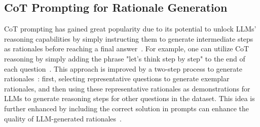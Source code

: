 \subsection{CoT Prompting for Rationale Generation}

CoT prompting has gained great popularity due to its potential to unlock LLMs' reasoning capabilities by simply instructing them to generate intermediate steps as rationales before reaching a final answer~\citep{wei_chain--thought_2023}. For example, one can utilize CoT reasoning by simply adding the phrase "let's think step by step" to the end of each question~\citep{kojima_large_2023}. This approach is improved by a two-step process to generate rationales~\citep{zhang_automatic_2022}: first, selecting representative questions to generate exemplar rationales, and then using these representative rationales as demonstrations for LLMs to generate reasoning steps for other questions in the dataset. This idea is further enhanced by including the correct solution in prompts can enhance the quality of LLM-generated rationales~\citep{magister_teaching_2023}. 
 



